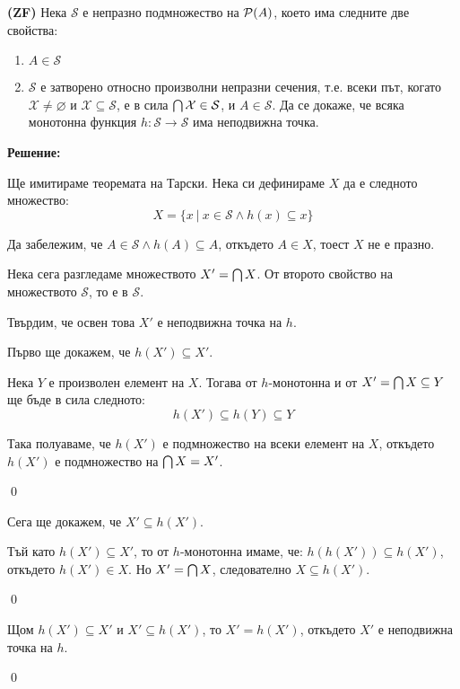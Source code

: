 \begin{problem}
\textbf{(ZF)}
Нека $\mathcal{S}$  е непразно подмножество на $\mathcal{P}(A)$, което има следните две свойства:
\begin{enumerate}
\item
$A \in \mathcal{S}$
\item
$\mathcal{S}$ е затворено относно произволни непразни сечения, т.е. всеки път,
когато $\mathcal{X} \neq \varnothing$ и $\mathcal{X} \subseteq \mathcal{S}$,
е в сила $\bigcap\mathcal{X} \in \mathcal{S}$, и $A \in \mathcal{S}$.
Да се докаже, че всяка монотонна функция $h: \mathcal{S} \to \mathcal{S}$ има неподвижна точка.
\end{enumerate}
\end{problem}

\textbf{Решение:}

\smallbreak
\quad
Ще имитираме теоремата на Тарски. Нека си дефинираме $X$ да е следното множество:
\[
X = \{ x \ |\ x \in \mathcal{S} \land h(x) \subseteq x\}
\]

\quad
Да забележим, че $A \in \mathcal{S} \land h(A) \subseteq A$, откъдето $A \in X$, тоест $X$ не е празно.

\quad
Нека сега разгледаме множеството $X' = \bigcap X$.
От второто свойство на множеството $\mathcal{S}$, то е в $\mathcal{S}$.

\quad
Твърдим, че освен това $X'$ е неподвижна точка на $h$.

\begin{tcolorbox}[mybox={Доказателство:}]
\quad
Първо ще докажем, че $h(X') \subseteq X'$.

\begin{tcolorbox}[mybox={Доказателство:}, colback=green!20, colframe=green!60]
\quad
Нека $Y$ е произволен елемент на $X$. Тогава от $h$-монотонна и от $X' = \bigcap X \subseteq Y$ ще бъде в сила следното:
\[
h(X') \subseteq h(Y) \subseteq Y
\]

\quad
Така полуаваме, че $h(X')$ е подмножество на всеки елемент на $X$,
откъдето $h(X')$ е подмножество на $\bigcap X = X'$.

\qed
\end{tcolorbox}

\quad
Сега ще докажем, че $X' \subseteq h(X')$.

\begin{tcolorbox}[mybox={Доказателство:}, colback=green!20, colframe=green!60]
\quad
Тъй като $h(X') \subseteq X'$, то от $h$-монотонна имаме, че:
$h(h(X')) \subseteq h(X')$, откъдето $h(X') \in X$. Но $X' = \bigcap X$,
следователно $X \subseteq h(X')$.

\qed
\end{tcolorbox}

\quad
Щом $h(X') \subseteq X'$ и $X' \subseteq h(X')$, то $X' = h(X')$, откъдето $X'$ е неподвижна точка на $h$.

\qed
\end{tcolorbox}

